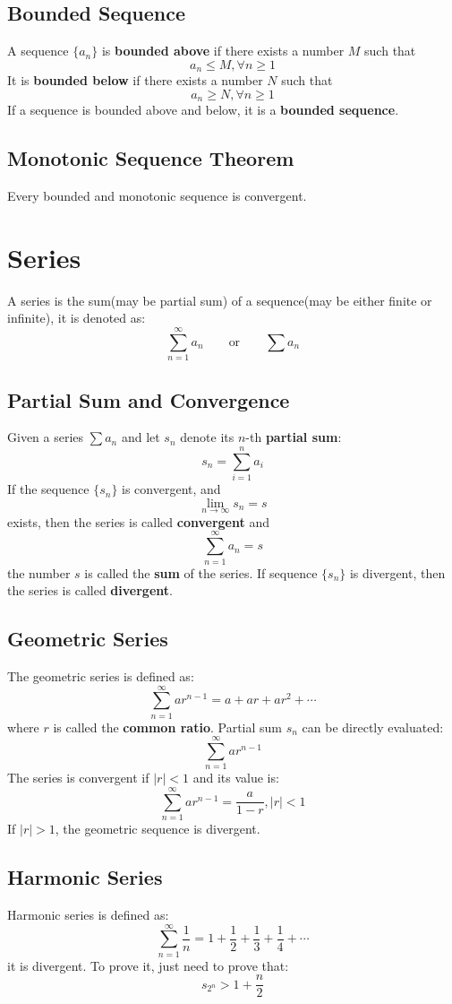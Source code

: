 \documentclass[10pt,a4paper,oneside]{article}
\begin{document}
\subsection{Bounded Sequence}
A sequence $\{a_n\}$ is \textbf{bounded above} if there exists a number $M$ such that
\[
a_n \leq M, \forall n \geq 1
\]
It is \textbf{bounded below} if there exists a number $N$ such that
\[
a_n\geq N, \forall n \geq 1
\]
If a sequence is bounded above and below, it is a \textbf{bounded sequence}.

\subsection{Monotonic Sequence Theorem}
Every bounded and monotonic sequence is convergent.

\section{Series}
A series is the sum(may be partial sum) of a sequence(may be either finite or infinite), it is denoted as:
\[
\sum_{n=1}^{\infty} a_n \qquad \text{or} \qquad \sum a_n
\]

\subsection{Partial Sum and Convergence}
Given a series $\sum a_n$ and let $s_n$ denote its $n$-th\textbf{ partial sum}:
\[
s_n = \sum_{i=1}^{n} a_i
\]
If the sequence $\{s_n\}$ is convergent, and
\[
\lim\limits_{n \rightarrow \infty} s_n = s
\]
exists, then the series is called \textbf{convergent} and
\[
\sum_{n=1}^{\infty} a_n = s
\]
the number $s$ is called the \textbf{sum} of the series. If sequence $\{s_n\}$ is divergent, then the series is called \textbf{divergent}.

\subsection{Geometric Series}
The geometric series is defined as:
\[
\sum_{n=1}^{\infty} ar^{n-1} = a + ar + ar^2 + \cdots
\]
where $r$ is called the \textbf{common ratio}. Partial sum $s_n$ can be directly evaluated:
\[
\sum_{n=1}^{\infty} ar^{n-1}
\]
The series is convergent if $|r|<1$ and its value is:
\[
\sum_{n=1}^{\infty} ar^{n-1} = \frac{a}{1-r}, |r|<1
\]
If $|r|>1$, the geometric sequence is divergent.

\subsection{Harmonic Series}
Harmonic series is defined as:
\[
\sum_{n=1}^{\infty} \frac{1}{n} = 1 +\frac{1}{2} +\frac{1}{3} +\frac{1}{4}+\cdots
\]
it is divergent. To prove it, just need to prove that:
\[
s_{2^n} > 1+ \frac{n}{2} 
\]
\end{document}
